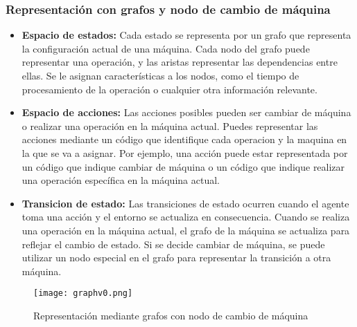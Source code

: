 \subsubsection{Representación con grafos y nodo de cambio de máquina}
\begin{itemize}
    \item \textbf{Espacio de estados:} Cada estado se representa por un grafo 
    que representa la configuración actual de una máquina. Cada nodo del grafo puede representar 
    una operación, y las aristas representar las dependencias entre ellas. Se le asignan
    características a los nodos, como el tiempo de procesamiento de la operación o cualquier 
    otra información relevante.
    \item \textbf{Espacio de acciones:} Las acciones posibles pueden ser cambiar de máquina 
    o realizar una operación en la máquina actual. Puedes representar las acciones mediante 
    un código que identifique cada operacion y la maquina en la que se va a asignar. Por 
    ejemplo, una acción puede estar representada por un código que indique cambiar de máquina o 
    un código que indique realizar una operación específica en la máquina actual.
    \item \textbf{Transicion de estado:} Las transiciones de estado ocurren cuando el agente 
    toma una acción y el entorno se actualiza en consecuencia. Cuando se realiza una operación 
    en la máquina actual, el grafo de la máquina se actualiza para reflejar el cambio de estado. 
    Si se decide cambiar de máquina, se puede utilizar un nodo especial en el grafo para representar 
    la transición a otra máquina.
\end{itemize}
\begin{figure}[ht]
    \centering
    \texttt{[image: graphv0.png]}
    \caption{Representación mediante grafos con nodo de cambio de máquina}
    \label{fig:rep-graph-v0}
\end{figure}
